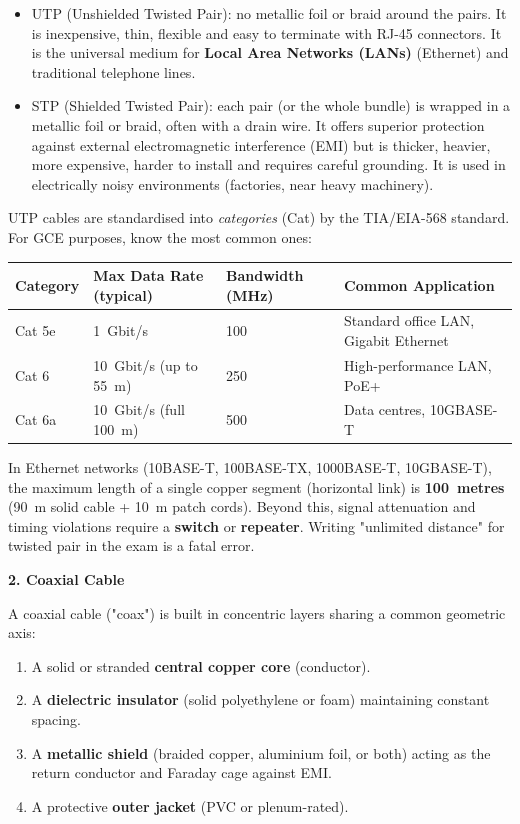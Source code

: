 \documentclass[11pt]{article}
\newcommand{\cle}[1]{{\popxbold\color{popdark}#1}}
\begin{document}
\begin{itemize}
\item \cle{UTP} (Unshielded Twisted Pair): no metallic foil or braid around the pairs. It is inexpensive, thin, flexible and easy to terminate with RJ-45 connectors. It is the universal medium for \textbf{Local Area Networks (LANs)} (Ethernet) and traditional telephone lines.
\item \cle{STP} (Shielded Twisted Pair): each pair (or the whole bundle) is wrapped in a metallic foil or braid, often with a drain wire. It offers superior protection against external electromagnetic interference (EMI) but is thicker, heavier, more expensive, harder to install and requires careful grounding. It is used in electrically noisy environments (factories, near heavy machinery).
\end{itemize}

UTP cables are standardised into \emph{categories} (Cat) by the TIA/EIA-568 standard. For GCE purposes, know the most common ones:

\begin{center}
\begin{tabularx}{\linewidth}{|l|X|X|X|}
\hline
\rowcolor{popblueL} \textbf{Category} & \textbf{Max Data Rate (typical)} & \textbf{Bandwidth (MHz)} & \textbf{Common Application} \\
\hline
Cat 5e & \SI{1}{Gbit/s} & 100 & Standard office LAN, Gigabit Ethernet \\
\hline
Cat 6 & \SI{10}{Gbit/s} (up to \SI{55}{m}) & 250 & High-performance LAN, PoE+ \\
\hline
Cat 6a & \SI{10}{Gbit/s} (full \SI{100}{m}) & 500 & Data centres, 10GBASE-T \\
\hline
\end{tabularx}
\end{center}

\begin{attention}
In Ethernet networks (10BASE-T, 100BASE-TX, 1000BASE-T, 10GBASE-T), the maximum length of a single copper segment (horizontal link) is \textbf{\SI{100}{metres}} (\SI{90}{m} solid cable + \SI{10}{m} patch cords). Beyond this, signal attenuation and timing violations require a \textbf{switch} or \textbf{repeater}. Writing "unlimited distance" for twisted pair in the exam is a fatal error.
\end{attention}

\textbf{2. Coaxial Cable}\par
A coaxial cable ("coax") is built in concentric layers sharing a common geometric axis:
\begin{enumerate}
\item A solid or stranded \textbf{central copper core} (conductor).
\item A \textbf{dielectric insulator} (solid polyethylene or foam) maintaining constant spacing.
\item A \textbf{metallic shield} (braided copper, aluminium foil, or both) acting as the return conductor and Faraday cage against EMI.
\item A protective \textbf{outer jacket} (PVC or plenum-rated).
\end{enumerate}
\end{document}
